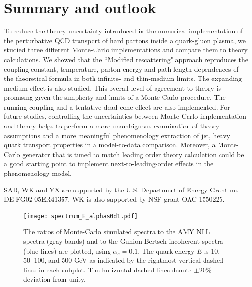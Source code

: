 \documentclass[aps, prc, reprint, amsmath, groupedaddress, nofootinbib]{revtex4-1}
\begin{document}
{%


\section{Summary and outlook}\label{section:summary}
To reduce the theory uncertainty introduced in the numerical implementation of the perturbative QCD transport of hard partons inside a quark-gluon plasma, we studied three different Monte-Carlo implementations and compare them to theory calculations.
We showed that the ``Modified rescattering" approach reproduces the coupling constant, temperature, parton energy and path-length dependences of the theoretical formula in both infinite- and thin-medium limits.
The expanding medium effect is also studied. 
This overall level of agreement to theory is promising given the simplicity and limits of a Monte-Carlo procedure. 
The running coupling and a tentative dead-cone effect are also implemented.
For future studies, controlling the uncertainties between Monte-Carlo implementation and theory helps to perform a more unambiguous examination of theory assumptions and a more meaningful phenomenology extraction of jet, heavy quark transport properties in a model-to-data comparison.
Moreover, a Monte-Carlo generator that is tuned to match leading order theory calculation could be a good starting point to implement next-to-leading-order effects in the phenomenology model.


\begin{acknowledgments}
SAB, WK and YX are supported by the U.S. Department of Energy Grant no. DE-FG02-05ER41367. WK is also supported by NSF grant OAC-1550225.
\end{acknowledgments}

\begin{appendices}
\begin{figure}
\texttt{[image: spectrum\_E\_alphas0d1.pdf]}
\caption{The ratios of Monte-Carlo simulated spectra to the AMY NLL spectra (gray bands) and to the Gunion-Bertsch incoherent spectra (blue lines) are plotted, using $\alpha_s = 0.1$. The quark energy $E$ is 10, 50, 100, and 500 GeV as indicated by the rightmost vertical dashed lines in each subplot. The horizontal dashed lines denote $\pm 20\%$ deviation from unity.}
\label{fig:spectra-alphas=0.1}
\end{figure}


\end{appendices}}
\end{document}
